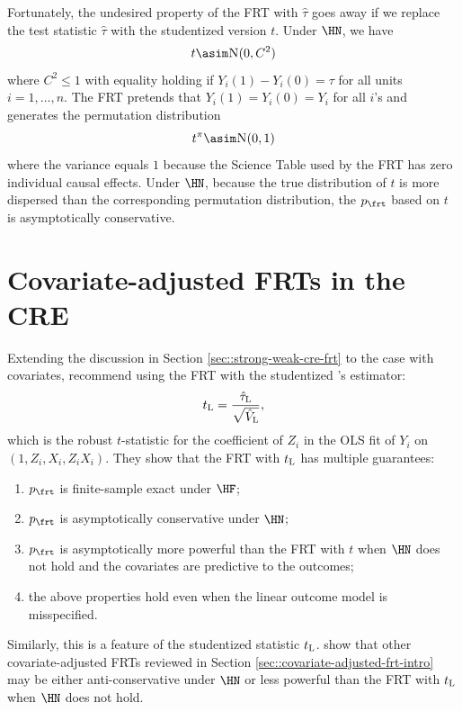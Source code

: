  
Fortunately, the undesired property of the FRT with $\hat\tau$ goes away if we replace the test statistic $\hat{\tau} $ with the studentized version $t$. Under $\HN$, we have
$$
t \asim \textsc{N}(0,  C^2)
$$ 
where $C^2 \leq 1$ with equality holding if $Y_i(1) - Y_i(0) = \tau$ for all units $i=1, \ldots, n$. The FRT pretends that $Y_i(1) = Y_i(0) = Y_i$ for all $i$'s and generates the permutation distribution
$$
t^\pi \asim \textsc{N}(0,  1)
$$
where the variance equals $1$ because the Science Table used by the FRT has zero individual causal effects.  Under $\HN$, because the true distribution of $t$ is more dispersed than the corresponding permutation distribution, the $p_\frt$ based on $t$ is asymptotically conservative. 


 
 
\section{Covariate-adjusted FRTs in the CRE}
 \label{sec::xfrt-cre}
 
Extending the discussion in Section \ref{sec::strong-weak-cre-frt} to the case with covariates, \citet{zhao2020caFRT} recommend using the FRT with the studentized \citet{lin2013}'s estimator:
$$
t_\textsc{L}   =  \frac{  \hat{\tau}_\textsc{L} }{  \sqrt{\hat{V}_\textsc{L}}  },
$$ 
which is the robust $t$-statistic for the coefficient of $Z_i$ in the OLS fit of $Y_i$ on $( 1, Z_i, X_i, Z_i X_i) $. They show that the FRT with $t_\textsc{L} $ has multiple guarantees:
 \begin{enumerate}
\item
 $p_\frt$ is finite-sample exact under $\HF$;
\item
 $p_\frt$ is asymptotically conservative under $\HN$;
\item
 $p_\frt$ is asymptotically more powerful than the FRT with $t$ when $\HN$ does not hold and the covariates are predictive to the outcomes;
\item
the above properties hold even when the linear outcome model is misspecified. 
\end{enumerate}
Similarly, this is a feature of the studentized statistic $t_\textsc{L} $. \citet{zhao2020caFRT} show that other covariate-adjusted FRTs reviewed in Section \ref{sec::covariate-adjusted-frt-intro} may  be either anti-conservative under $\HN$ or less powerful than the FRT with $t_\textsc{L} $ when $\HN$ does not hold.  

